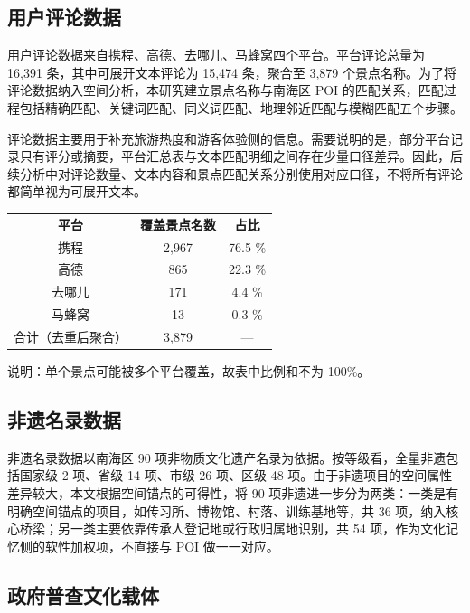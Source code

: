 \subsection{用户评论数据}\label{ux7528ux6237ux8bc4ux8bbaux6570ux636e}

用户评论数据来自携程、高德、去哪儿、马蜂窝四个平台。平台评论总量为 16,391 条，其中可展开文本评论为 15,474 条，聚合至 3,879 个景点名称。为了将评论数据纳入空间分析，本研究建立景点名称与南海区 POI 的匹配关系，匹配过程包括精确匹配、关键词匹配、同义词匹配、地理邻近匹配与模糊匹配五个步骤。

评论数据主要用于补充旅游热度和游客体验侧的信息。需要说明的是，部分平台记录只有评分或摘要，平台汇总表与文本匹配明细之间存在少量口径差异。因此，后续分析中对评论数量、文本内容和景点匹配关系分别使用对应口径，不将所有评论都简单视为可展开文本。


{\def\LTcaptype{none} %
\begin{longtable}[]{@{}ccc@{}}
\toprule\noalign{}
\endhead
\bottomrule\noalign{}
\endlastfoot
\textbf{平台} & \textbf{覆盖景点名数} & \textbf{占比} \\
携程 & 2,967 & 76.5 \% \\
高德 & 865 & 22.3 \% \\
去哪儿 & 171 & 4.4 \% \\
马蜂窝 & 13 & 0.3 \% \\
合计（去重后聚合） & 3,879 & --- \\
\end{longtable}
}

说明：单个景点可能被多个平台覆盖，故表中比例和不为 100\%。

\subsection{非遗名录数据}\label{ux975eux9057ux540dux5f55ux6570ux636e}

非遗名录数据以南海区 90 项非物质文化遗产名录为依据。按等级看，全量非遗包括国家级 2 项、省级 14 项、市级 26 项、区级 48 项。由于非遗项目的空间属性差异较大，本文根据空间锚点的可得性，将 90 项非遗进一步分为两类：一类是有明确空间锚点的项目，如传习所、博物馆、村落、训练基地等，共 36 项，纳入核心桥梁；另一类主要依靠传承人登记地或行政归属地识别，共 54 项，作为文化记忆侧的软性加权项，不直接与 POI 做一一对应。

\subsection{政府普查文化载体}\label{ux653fux5e9cux666eux67e5ux6587ux5316ux8f7dux4f53ux4e3bux6865ux6881ux6e05ux5355}

